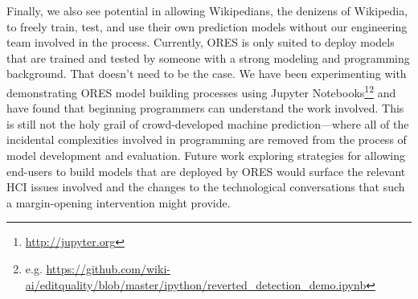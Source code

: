 Finally, we also see potential in allowing Wikipedians, the denizens of Wikipedia, to freely train, test, and use their own prediction models without our engineering team involved in the process.  Currently, ORES is only suited to deploy models that are trained and tested by someone with a strong modeling and programming background.  That doesn't need to be the case.  We have been experimenting with demonstrating ORES model building processes using Jupyter Notebooks\footnote{\url{http://jupyter.org}}\footnote{e.g. \url{ https://github.com/wiki-ai/editquality/blob/master/ipython/reverted_detection_demo.ipynb}} and have found that beginning programmers can understand the work involved.  This is still not the holy grail of crowd-developed machine prediction---where all of the incidental complexities involved in programming are removed from the process of model development and evaluation.  Future work exploring strategies for allowing end-users to build models that are deployed by ORES would surface the relevant HCI issues involved and the changes to the technological conversations that such a margin-opening intervention might provide.
